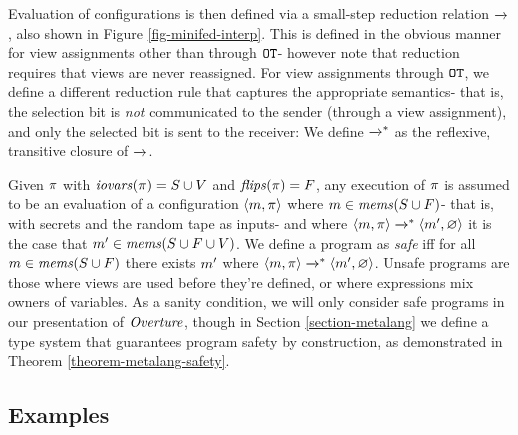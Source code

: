 Evaluation of configurations is then defined via a small-step reduction relation $\xrightarrow{}$,
also shown in Figure \ref{fig-minifed-interp}.
This is defined in the obvious manner for view assignments other than through
$\texttt{OT}$- however note that reduction requires that views are never reassigned. 
For view assignments through $\texttt{OT}$, we define a different reduction rule that
captures the appropriate semantics- that is, the selection bit is \emph{not} communicated
to the sender (through a view assignment), and only the selected bit is sent to the receiver:
We define $\xrightarrow{}^{*}$ as the reflexive, transitive closure of $\xrightarrow{}$.

Given $\pi$ with $\mathit{iovars}(\pi) = S \cup V$ and $\mathit{flips}(\pi) = F$,
any execution of $\pi$ is assumed to be an evaluation of a
configuration $\langle m,\pi \rangle$ where $m \in \mathit{mems}(S \cup
F)$- that is, with secrets and the random tape as inputs- and where
$\langle m,\pi \rangle \xrightarrow{}^{*} \langle m',\varnothing \rangle$ it is
the case that $m' \in \mathit{mems}(S \cup F \cup V)$. We define a
program as \emph{safe} iff for all $m \in \mathit{mems}(S \cup F)$ there
exists $m'$ where $\langle m,\pi \rangle \xrightarrow{}^{*}
\langle m',\varnothing \rangle$. Unsafe programs are those where views
are used before they're defined, or where expressions mix owners of
variables. As a sanity condition, we will only consider safe 
programs in our presentation of $\mathit{Overture}$, though in Section
\ref{section-metalang} we define a type system that guarantees
program safety by construction, as demonstrated in Theorem
\ref{theorem-metalang-safety}.

\subsection{Examples}
\label{section-minicat-examples}


